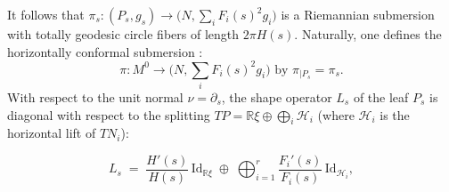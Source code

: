 \documentclass[11pt]{amsart}
\theoremstyle{plain}
\numberwithin{equation}{section}
\theoremstyle{definition}
\newtheorem*{standingx}{Standing assumption}
\theoremstyle{remark}
\begin{document}

\noindent It follows that $\pi_s : (P_s, g_s) \to \big(N, \sum_i F_i(s)^2 g_i\big)$ is a Riemannian submersion with totally geodesic circle fibers of length $2\pi H(s)$. Naturally, one defines the horizontally conformal submersion \cite{OR93}:
\[\pi: M^0\to \big(N, \sum_i F_i(s)^2 g_i\big) \text{   by  } \pi_{\mid P_s}= \pi_s.\] 
With respect to the unit normal $\nu = \partial_s$, the shape operator $L_s$ of the leaf $P_s$ is diagonal with respect to the splitting $TP = \mathbb{R}\xi \oplus \bigoplus_i \mathcal{H}_i$ (where $\mathcal{H}_i$ is the horizontal lift of $TN_i$):

\begin{equation}\label{eq:shape-operator}
	L_s \;=\; \frac{H'(s)}{H(s)}\, \mathrm{Id}_{\mathbb{R}\xi} \;\oplus\; \bigoplus_{i=1}^r \frac{F_i'(s)}{F_i(s)}\, \mathrm{Id}_{\mathcal{H}_i},
\end{equation}


	
\end{document}
